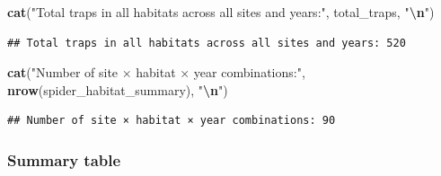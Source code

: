 \documentclass[
]{article}
\newenvironment{Shaded}{\begin{snugshade}}{\end{snugshade}}
\newcommand{\FunctionTok}[1]{\textcolor[rgb]{0.13,0.29,0.53}{\textbf{#1}}}
\newcommand{\NormalTok}[1]{#1}
\newcommand{\SpecialCharTok}[1]{\textcolor[rgb]{0.81,0.36,0.00}{\textbf{#1}}}
\newcommand{\StringTok}[1]{\textcolor[rgb]{0.31,0.60,0.02}{#1}}
\begin{document}
\begin{Shaded}
\begin{Highlighting}[]
\FunctionTok{cat}\NormalTok{(}\StringTok{"Total traps in all habitats across all sites and years:"}\NormalTok{, total\_traps, }\StringTok{"}\SpecialCharTok{\textbackslash{}n}\StringTok{"}\NormalTok{)}
\end{Highlighting}
\end{Shaded}

\begin{verbatim}
## Total traps in all habitats across all sites and years: 520
\end{verbatim}

\begin{Shaded}
\begin{Highlighting}[]
\FunctionTok{cat}\NormalTok{(}\StringTok{"Number of site × habitat × year combinations:"}\NormalTok{, }\FunctionTok{nrow}\NormalTok{(spider\_habitat\_summary), }\StringTok{"}\SpecialCharTok{\textbackslash{}n}\StringTok{"}\NormalTok{)}
\end{Highlighting}
\end{Shaded}

\begin{verbatim}
## Number of site × habitat × year combinations: 90
\end{verbatim}

\subsubsection{Summary table}\label{summary-table}
\end{document}
